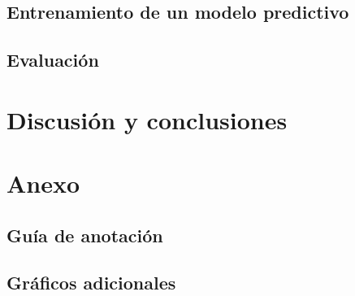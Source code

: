 \documentclass[colorinlistoftodos]{article}
\begin{document}
\subsection{Entrenamiento de un modelo predictivo}\label{subsection-results-models}
%

\subsection{Evaluaci\'on}\label{subsection-results-evaluation}



\section{Discusi\'on y conclusiones}\label{section-discussion}




\clearpage
\appendix
\section{Anexo}\label{appendix}

\subsection{Guía de anotación}\label{appendix-annotation}


\subsection{Gráficos adicionales}\label{appendix-plots}


\listoftodos%
\end{document}
